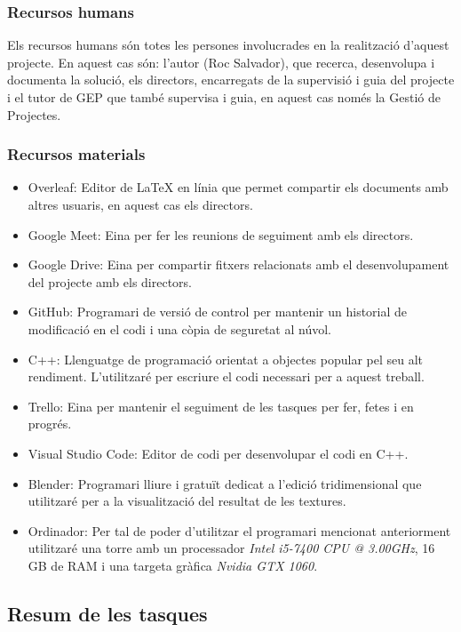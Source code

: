 \documentclass{article}
\begin{document}
\subsubsection{Recursos humans}

Els recursos humans són totes les persones involucrades en la realització d'aquest projecte. En aquest cas són: l'autor (Roc Salvador), que recerca, desenvolupa i documenta la solució, els directors, encarregats de la supervisió i guia del projecte i el tutor de GEP que també supervisa i guia, en aquest cas només la Gestió de Projectes.

\subsubsection{Recursos materials}

\begin{itemize}
    \item Overleaf: Editor de LaTeX en línia que permet compartir els documents amb altres usuaris, en aquest cas els directors.
    \item Google Meet: Eina per fer les reunions de seguiment amb els directors.
    \item Google Drive: Eina per compartir fitxers relacionats amb el desenvolupament del projecte amb els directors.
    \item GitHub: Programari de versió de control per mantenir un historial de modificació en el codi i una còpia de seguretat al núvol.
    \item C++: Llenguatge de programació orientat a objectes popular pel seu alt rendiment. L'utilitzaré per escriure el codi necessari per a aquest treball.
    \item Trello: Eina per mantenir el seguiment de les tasques per fer, fetes i en progrés.
    \item Visual Studio Code: Editor de codi per desenvolupar el codi en C++.
    \item Blender: Programari lliure i gratuït dedicat a l'edició tridimensional que utilitzaré per a la visualització del resultat de les textures.
    \item Ordinador: Per tal de poder d'utilitzar el programari mencionat anteriorment utilitzaré una torre amb un processador \textit{Intel i5-7400 CPU @ 3.00GHz}, 16 GB de RAM i una targeta gràfica \textit{Nvidia GTX 1060}.
\end{itemize}

\subsection{Resum de les tasques}
\end{document}
